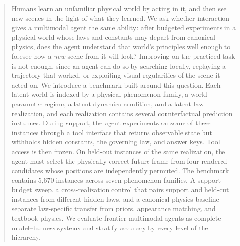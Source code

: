 \begin{abstract}
Humans learn an unfamiliar physical world by acting in it, and then see new scenes in the light of what they learned. We ask whether interaction gives a multimodal agent the same ability: after budgeted experiments in a physical world whose laws and constants may depart from canonical physics, does the agent understand that world's principles well enough to foresee how a \emph{new} scene from it will look? Improving on the practiced task is not enough, since an agent can do so by searching locally, replaying a trajectory that worked, or exploiting visual regularities of the scene it acted on. We introduce a benchmark built around this question. Each latent world is indexed by a physical-phenomenon family, a world-parameter regime, a latent-dynamics condition, and a latent-law realization, and each realization contains several counterfactual prediction instances. During support, the agent experiments on some of these instances through a tool interface that returns observable state but withholds hidden constants, the governing law, and answer keys. Tool access is then frozen. On held-out instances of the same realization, the agent must select the physically correct future frame from four rendered candidates whose positions are independently permuted. The benchmark contains 5,670 instances across seven phenomenon families. A support-budget sweep, a cross-realization control that pairs support and held-out instances from different hidden laws, and a canonical-physics baseline separate law-specific transfer from priors, appearance matching, and textbook physics. We evaluate frontier multimodal agents as complete model--harness systems and stratify accuracy by every level of the hierarchy. 
\end{abstract}
